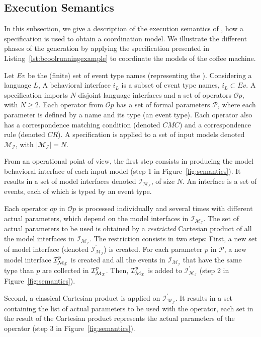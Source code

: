 \subsection{Execution Semantics}
In this subsection, we give a description of the execution semantics of \bcool, \ie how a \bcool specification is used to obtain a coordination model. We illustrate the different phases of the generation by applying the specification presented in Listing~\ref{lst:bcoolrunningexample} to coordinate the models of the coffee machine.

Let $Ev$ be the (finite) set of event type names (representing the \dse). Considering a language $L$, A behavioral interface $i_L$ is a subset of event type names, $i_L \subset Ev$. A \bcool specification imports $N$ disjoint language interfaces and a set of operators $\mathcal{O}p$, with $N\geq 2$. Each operator from $\mathcal{O}p$ has a set of formal parameters $\mathcal{P}$, where each parameter is defined by a name and its type (\ie an event type). Each operator also has a correspondence matching condition (denoted $CMC$) and a correspondence rule (denoted $CR$). A \bcool specification is applied to a set of input models denoted $\mathcal{M_I}$, with $|\mathcal{M_I}| = N$.

From an operational point of view, the first step consists in producing the model behavioral interface of each input model (step 1 in Figure~\ref{fig:semantics}). It results in a set of model interfaces denoted $\mathcal{I_{M_I}}$, of size $N$. An interface is a set of events, each of which is typed by an event type. 

Each operator $op$ in $\mathcal{O}p$ is processed individually and several times with different actual parameters, which depend on the model interfaces in $\mathcal{I_{M_I}}$. The set of actual parameters to be used is obtained by a \emph{restricted} Cartesian product of all the model interfaces in $\mathcal{I_{M_I}}$. The restriction consists in two steps: First, a new set of model interface (denoted $\mathcal{I^{'}_{M_I}}$) is created. For each parameter $p$ in $\mathcal{P}$, a new model interface $\mathcal{I^{\textit{\text{p}}}_{M_I}}$ is created and all the events in $\mathcal{I_{M_I}}$ that have the same type than $p$ are collected in $\mathcal{I^{\textit{\text{p}}}_{M_I}}$. Then, $\mathcal{I^{\textit{\text{p}}}_{M_I}}$ is added to $\mathcal{I^{'}_{M_I}}$ (step 2 in Figure~\ref{fig:semantics}). 
%

Second, a classical Cartesian product is applied on $\mathcal{I^{'}_{M_I}}$. It results in a set containing the list of actual parameters to be used with the operator, \ie each set in the result of the Cartesian product represents the actual parameters of the operator (step 3 in Figure~\ref{fig:semantics}). 

